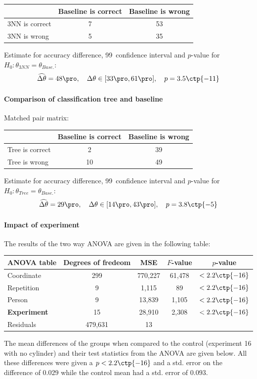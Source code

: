 \documentclass[11pt,fleqn]{article}
\begin{document}
\begin{table}[H]
	\centering
	\begin{tabular}{l|c c}
		&Baseline is correct& Baseline is wrong \\
		\hline
		3NN is correct &7& 53\\
		3NN is wrong& 5& 35
	\end{tabular}
\end{table}\noindent 
Estimate for accuracy difference, 99\pro\ confidence interval and \(p\)-value for \(H_0: \theta_{3NN}=\theta_{Base.}\):
\[
\widehat{\Delta \theta} = 48\pro,\quad  \Delta \theta\in[33\pro , 61\pro], \quad p = 3.5\ctp{-11}
\]

\paragraph{Comparison of classification tree and baseline}
Matched pair matrix:

\begin{table}[H]
	\centering
	\begin{tabular}{l|c c}
		&Baseline is correct& Baseline is wrong \\
		\hline
		Tree is correct &2& 39\\
		Tree is wrong& 10& 49
	\end{tabular}
\end{table}\noindent 
Estimate for accuracy difference, 99\pro\ confidence interval and \(p\)-value for \(H_0: \theta_{Tree}=\theta_{Base.}\):
\[
\widehat{\Delta \theta} = 29\pro,\quad  \Delta \theta\in[14\pro , 43\pro], \quad p = 3.8\ctp{-5}
\]

\paragraph{Impact of experiment} The results of the two way ANOVA are given in the following table:
\begin{table}[H]
	\centering
	\begin{tabular}{l | c c c c}
		ANOVA table & Degrees of fredeom& MSE&\(F\)-value&\(p\)-value\\
		\hline 
		Coordinate  & 299 & 770,227 & 		61,478 	& \(<2.2\ctp{-16}\)	\\
		Repetition  & 9 &  1,115 & 			89	 	&\(<2.2\ctp{-16}\)  \\
		Person  & 9 & 13,839 &	 			1,105 	&\(<2.2\ctp{-16}\)	\\
		\textbf{Experiment}  & 15 &  28,910 & 2,308 & \(<2.2\ctp{-16}\)	\\
		Residuals &479,631 & 13 &			
	\end{tabular}
		\label{tab:ranova}
\end{table}\noindent
The mean differences of the groups when compared to the control (experiment 16 with no cylinder) and their test statistics from the ANOVA are given below. All these differences were given a \(p<2.2\ctp{-16}\) and a std. error on the difference of \(0.029\) while the control mean had a std. error of \(0.093\).
\end{document}
